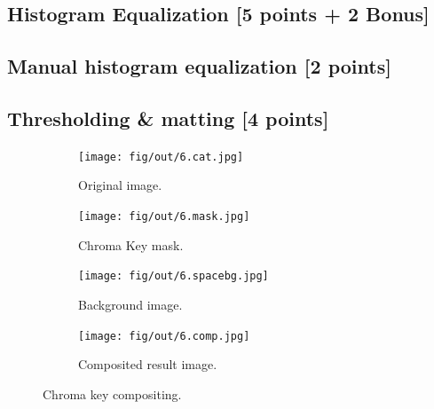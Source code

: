 \documentclass[tikz,14pt,fleqn]{article}
\begin{document}
\subsection{Histogram Equalization [5 points + 2 Bonus]}


\subsection{Manual histogram equalization [2 points]}


\subsection{Thresholding \& matting [4 points]}

\begin{figure}[h!]
    \begin{subfigure}{0.33\textwidth}
        \centering
        \texttt{[image: fig/out/6.cat.jpg]}
        \caption{Original image.}
    \end{subfigure}
    \begin{subfigure}{0.33\textwidth}
        \centering
        \texttt{[image: fig/out/6.mask.jpg]}
        \caption{Chroma Key mask.}
    \end{subfigure}
    \begin{subfigure}{0.33\textwidth}
        \centering
        \texttt{[image: fig/out/6.spacebg.jpg]}
        \caption{Background image.}
    \end{subfigure}

    \begin{subfigure}{1\textwidth}
        \centering
        \texttt{[image: fig/out/6.comp.jpg]}
        \caption{Composited result image.}
    \end{subfigure}

    \caption{Chroma key compositing.}
\end{figure}
\end{document}
